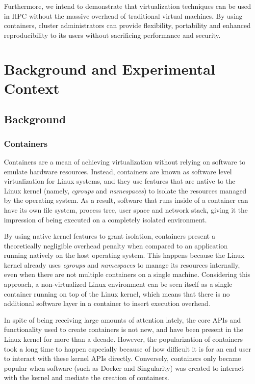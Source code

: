 \documentclass[12pt]{article}
\begin{document}
Furthermore, we intend to demonstrate that virtualization techniques can be used in HPC without the massive overhead of traditional virtual machines. By using containers, cluster administrators can provide flexibility, portability and enhanced reproducibility to its users without sacrificing performance and security.

\section{Background and Experimental Context}
\label{sec:orge223d9e}
\subsection{Background}
\label{sec:orgbdd586a}
\subsubsection{Containers}
\label{sec:orgd40c5fc}
Containers are a mean of achieving virtualization without relying on software to emulate hardware resources. Instead, containers are known as software level virtualization for Linux systems, and they use features that are native to the Linux kernel (namely, \textit{cgroups} and \textit{namespaces}) to isolate the resources managed by the operating system. As a result, software that runs inside of a container can have its own file system, process tree, user space and network stack, giving it the impression of being executed on a completely isolated environment.

By using native kernel features to grant isolation, containers present a theoretically negligible overhead penalty when compared to an application running natively on the host operating system. This happens because the Linux kernel already uses \textit{cgroups} and \textit{namespaces} to manage its resources internally, even when there are not multiple containers on a single machine. Considering this approach, a non-virtualized Linux environment can be seen itself as a single container running on top of the Linux kernel, which means that there is no additional software layer in a container to insert execution overhead.

In spite of being receiving large amounts of attention lately, the core APIs and functionality used to create containers is not new, and have been present in the Linux kernel for more than a decade. However, the popularization of containers took a long time to happen especially because of how difficult it is for an end user to interact with these kernel APIs directly. Conversely, containers only became popular when software (such as Docker and Singularity) was created to interact with the kernel and mediate the creation of containers.
\end{document}

